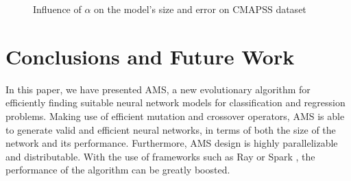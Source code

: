 \documentclass[preprint,12pt]{elsarticle}%
\begin{document}
\begin{figure}[H]
\centering
{}
\caption{Influence of $\alpha$ on the model's size and error on CMAPSS dataset}
\label{fig:alpha_cmapss}
\end{figure}

\section{Conclusions and Future Work}
\label{sec:conclusions}

In this paper, we have presented AMS, a new evolutionary algorithm for efficiently finding suitable neural network models for classification and regression problems. Making use of efficient mutation and crossover operators, AMS is able to generate valid and efficient neural networks, in terms of both the size of the network and its performance. Furthermore, AMS design is highly parallelizable and distributable. With the use of frameworks such as Ray \cite{Moritz2017} or Spark \cite{Zaharia2010}, the performance of the algorithm can be greatly boosted.
\end{document}
